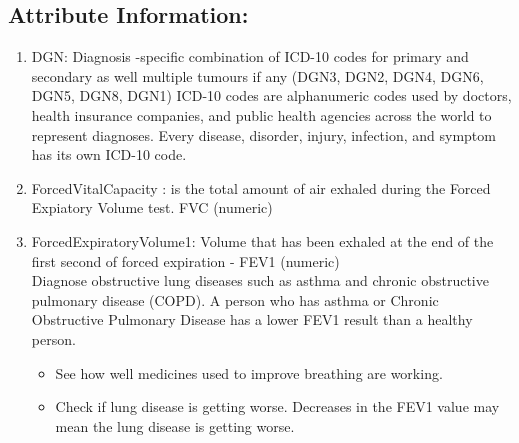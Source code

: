 \documentclass[a4paper, 11pt, oneside]{article} %
\begin{document}
\subsection{Attribute Information:} 
\begin{enumerate} 
\item DGN: Diagnosis -specific combination of ICD-10 codes for primary and secondary as well multiple tumours if any (DGN3, DGN2, DGN4, DGN6, DGN5, DGN8, DGN1)
ICD-10 codes are alphanumeric codes used by doctors, health insurance companies, and public health agencies across the world to represent diagnoses. Every disease, disorder, injury, infection, and symptom has its own ICD-10 code. 
\item ForcedVitalCapacity : is the total amount of air exhaled during the Forced Expiatory Volume test. FVC (numeric) 
\item ForcedExpiratoryVolume1: Volume that has been exhaled at the end of the first second of forced expiration - FEV1 (numeric)\\
Diagnose obstructive lung diseases such as asthma and chronic obstructive pulmonary disease (COPD). A person who has asthma or Chronic Obstructive Pulmonary Disease has a lower FEV1 result than a healthy person.
\begin{itemize}
\item See how well medicines used to improve breathing are working.
\item Check if lung disease is getting worse. Decreases in the FEV1 value may mean the lung disease is getting worse.
\end{itemize}


\end{enumerate}
\end{document}
